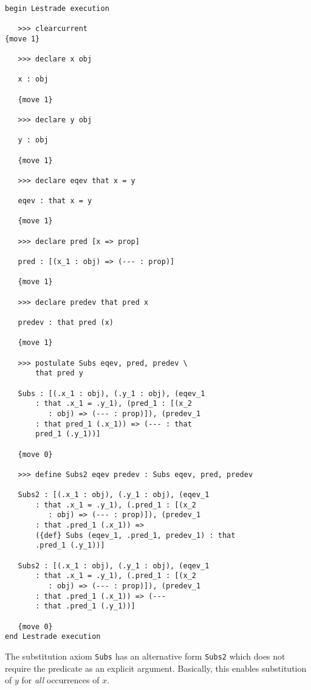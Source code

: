\documentclass[12pt]{article}
\begin{document}
\begin{verbatim}

begin Lestrade execution

   >>> clearcurrent
{move 1}

   >>> declare x obj

   x : obj

   {move 1}

   >>> declare y obj

   y : obj

   {move 1}

   >>> declare eqev that x = y

   eqev : that x = y

   {move 1}

   >>> declare pred [x => prop]

   pred : [(x_1 : obj) => (--- : prop)]

   {move 1}

   >>> declare predev that pred x

   predev : that pred (x)

   {move 1}

   >>> postulate Subs eqev, pred, predev \
       that pred y

   Subs : [(.x_1 : obj), (.y_1 : obj), (eqev_1 
       : that .x_1 = .y_1), (pred_1 : [(x_2 
          : obj) => (--- : prop)]), (predev_1 
       : that pred_1 (.x_1)) => (--- : that 
       pred_1 (.y_1))]

   {move 0}

   >>> define Subs2 eqev predev : Subs eqev, pred, predev

   Subs2 : [(.x_1 : obj), (.y_1 : obj), (eqev_1 
       : that .x_1 = .y_1), (.pred_1 : [(x_2 
          : obj) => (--- : prop)]), (predev_1 
       : that .pred_1 (.x_1)) => 
       ({def} Subs (eqev_1, .pred_1, predev_1) : that 
       .pred_1 (.y_1))]

   Subs2 : [(.x_1 : obj), (.y_1 : obj), (eqev_1 
       : that .x_1 = .y_1), (.pred_1 : [(x_2 
          : obj) => (--- : prop)]), (predev_1 
       : that .pred_1 (.x_1)) => (--- 
       : that .pred_1 (.y_1))]

   {move 0}
end Lestrade execution

\end{verbatim}

The substitution axiom {\tt Subs} has an alternative form {\tt Subs2} which does not require the predicate as an explicit argument.
Basically, this enables substitution of $y$ for {\em all\/} occurrences of $x$.
\end{document}

